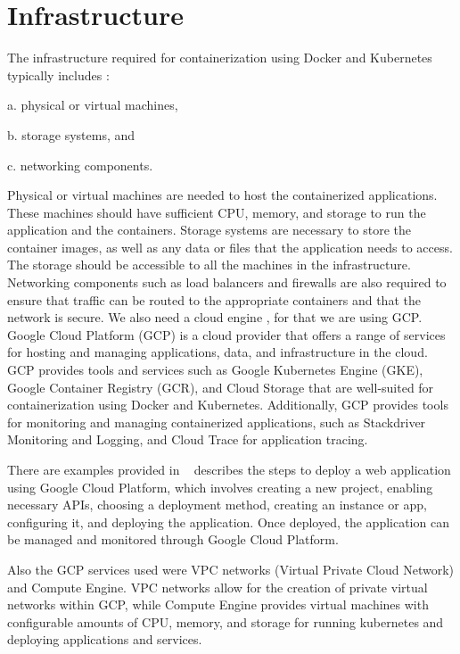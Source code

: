\section{Infrastructure}
The infrastructure required for containerization using Docker and Kubernetes typically includes :

a. physical or virtual machines,

b. storage systems, and 

c. networking components. 

Physical or virtual machines are needed to host the containerized applications. These machines should have sufficient CPU, memory, and storage to run the application and the containers. Storage systems are necessary to store the container images, as well as any data or files that the application needs to access. The storage should be accessible to all the machines in the infrastructure. Networking components such as load balancers and firewalls are also required to ensure that traffic can be routed to the appropriate containers and that the network is secure.
We also need a cloud engine , for that we are using GCP. Google Cloud Platform (GCP) is a cloud provider that offers a range of services for hosting and managing applications, data, and infrastructure in the cloud. GCP provides tools and services such as Google Kubernetes Engine (GKE), Google Container Registry (GCR), and Cloud Storage that are well-suited for containerization using Docker and Kubernetes. Additionally, GCP provides tools for monitoring and managing containerized applications, such as Stackdriver Monitoring and Logging, and Cloud Trace for application tracing.

There are examples provided in ~\cite{gupta2020deploy} describes the steps to deploy a web application using Google Cloud Platform, which involves creating a new project, enabling necessary APIs, choosing a deployment method, creating an instance or app, configuring it, and deploying the application. Once deployed, the application can be managed and monitored through Google Cloud Platform.

Also the GCP services used were VPC networks (Virtual Private Cloud Network) and Compute Engine. VPC networks allow for the creation of private virtual networks within GCP, while Compute Engine provides virtual machines with configurable amounts of CPU, memory, and storage for running kubernetes and deploying applications and services.








